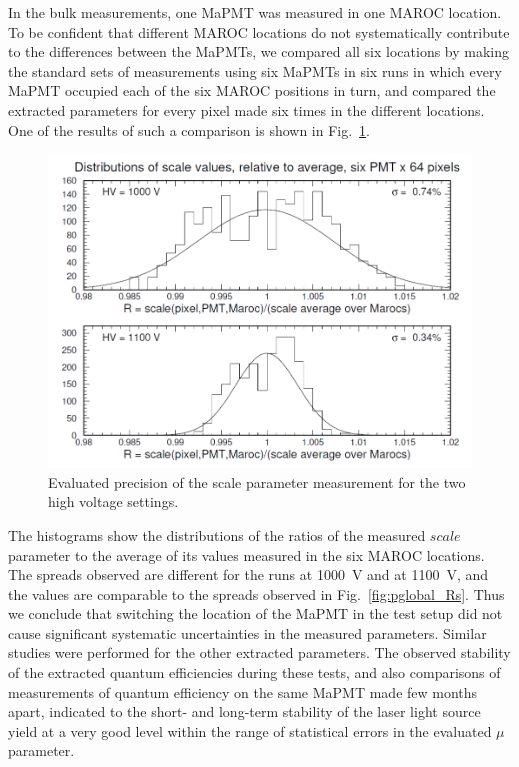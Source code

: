 In the bulk measurements, one MaPMT was measured in one MAROC location. To be confident that different MAROC locations do not systematically contribute to the differences between the MaPMTs, we compared all six locations by making the standard sets of measurements using six MaPMTs in six runs in which every MaPMT occupied each of the six MAROC positions in turn, and compared the extracted parameters for every pixel made six times in the different locations. One of the results of such a comparison is shown in Fig.~\ref{fig:R_scale_maroc_avg}. 
\begin{figure}[h!]
	\centering
	\includegraphics[width=0.98\linewidth, trim=0 10 15 10, clip]{figures/R_scale_maroc_avg.png}
	\caption{Evaluated precision of the scale parameter measurement for the two high voltage settings.}
	\label{fig:R_scale_maroc_avg}
\end{figure}
The histograms show the distributions of the ratios of the measured $scale$ parameter to the average of its values measured in the six MAROC locations. The spreads observed are different for the runs at 1000~V and at 1100~V, and the values are comparable to the spreads observed in Fig.~\ref{fig:pglobal_Rs}. Thus we conclude that switching the location of the MaPMT in the test setup did not cause significant systematic uncertainties in the measured parameters. Similar studies were performed for the other extracted parameters. The observed stability of the extracted quantum efficiencies during these tests, and also comparisons of measurements of quantum efficiency on the same MaPMT made few months apart, indicated to the short- and long-term stability of the laser light source yield at a very good level within the range of statistical errors in the evaluated $\mu$ parameter.  


